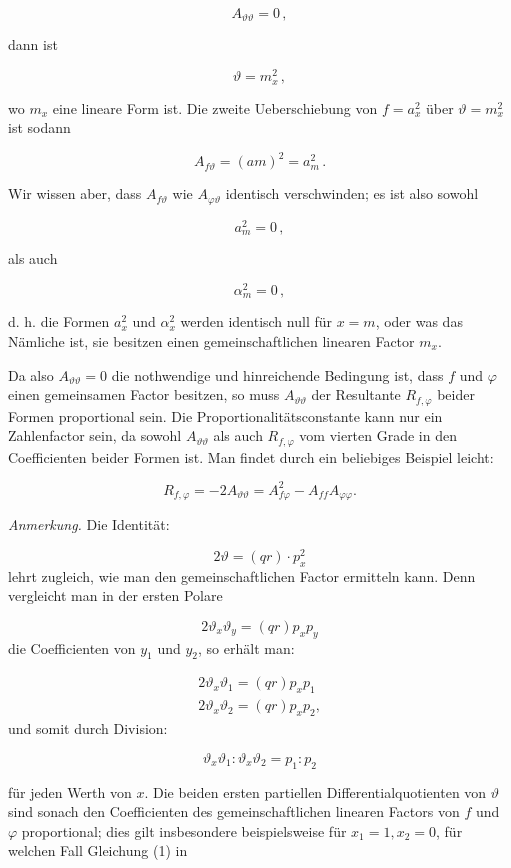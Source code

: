 \documentclass[11pt]{article}
\providecommand{\weberpage}[1]{}
\providecommand{\weq}[2]{\begin{equation}\tag{#1}#2\end{equation}}
\begin{document}
\[
A_{\vartheta\vartheta} = 0\,,
\]

dann ist

\[
\vartheta = m_x^2\,,
\]

wo $m_x$ eine lineare Form ist. Die zweite Ueberschiebung von $f = a_x^2$
über $\vartheta = m_x^2$ ist sodann

\[
A_{f\vartheta} = (am)^2 = a_m^2\,.
\]

Wir wissen aber, dass $A_{f\vartheta}$ wie $A_{\varphi\vartheta}$ identisch verschwinden; es
ist also sowohl

\[
a_m^2 = 0\,,
\]

als auch

\[
\alpha_m^2 = 0\,,
\]


\weberpage{145}
d. h. die Formen $a_x^2$ und $\alpha_x^2$ werden identisch null für $x=m$, oder was das
Nämliche ist, sie besitzen einen gemeinschaftlichen linearen Factor $m_x$.

Da also $A_{\vartheta\vartheta}=0$ die nothwendige und hinreichende Bedingung ist,
dass $f$ und $\varphi$ einen gemeinsamen Factor besitzen, so muss $A_{\vartheta\vartheta}$
der Resultante $R_{f,\varphi}$ beider Formen proportional sein. Die
Proportionalitätsconstante kann nur ein Zahlenfactor sein, da sowohl $A_{\vartheta\vartheta}$
als auch $R_{f,\varphi}$ vom vierten Grade in den Coefficienten beider Formen ist. Man
findet durch ein beliebiges Beispiel leicht:

\[
R_{f,\varphi} = -2A_{\vartheta\vartheta} = A_{f\varphi}^2 - A_{ff}A_{\varphi\varphi}.
\]

\textit{Anmerkung.} Die Identität:

\[
2\vartheta = (qr)\cdot p_x^2
\]
lehrt zugleich, wie man den gemeinschaftlichen Factor ermitteln kann. Denn vergleicht
man in der ersten Polare

\[
2\vartheta_x\vartheta_y = (qr)p_xp_y
\]
die Coefficienten von $y_1$ und $y_2$, so erhält man:

\[
\begin{gathered}
2\vartheta_x\vartheta_1 = (qr)p_xp_1\\
2\vartheta_x\vartheta_2 = (qr)p_xp_2,
\end{gathered}
\]
und somit durch Division:

\weq{1}{\vartheta_x\vartheta_1 : \vartheta_x\vartheta_2 = p_1:p_2}

für jeden Werth von $x$. Die beiden ersten partiellen Differentialquotienten von
$\vartheta$ sind sonach den Coefficienten des gemeinschaftlichen linearen Factors von
$f$ und $\varphi$ proportional; dies gilt insbesondere beispielsweise für $x_1=1,
x_2=0$, für welchen Fall Gleichung (1) in
\end{document}

